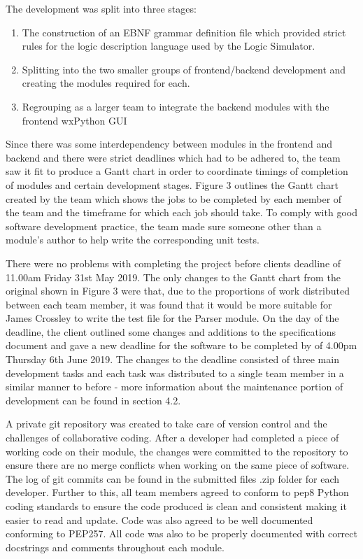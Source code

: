 \documentclass{article}					%
\begin{document}
The development was split into three stages:
\begin{enumerate}
  \item The construction of an EBNF grammar definition file which provided strict rules for the logic description language used by the Logic Simulator.
  \item Splitting into the two smaller groups of frontend/backend development and creating the modules required for each.
  \item Regrouping as a larger team to integrate the backend modules with the frontend wxPython GUI
\end{enumerate}

Since there was some interdependency between modules in the frontend and backend and there were strict deadlines which had to be adhered to, the team saw it fit to produce a Gantt chart in order to coordinate timings of completion of modules and certain development stages. Figure 3 outlines the Gantt chart created by the team which shows the jobs to be completed by each member of the team and the timeframe for which each job should take. To comply with good software development practice, the team made sure someone other than a module’s author to help write the corresponding unit tests.

There were no problems with completing the project before clients deadline of 11.00am Friday 31st May 2019. The only changes to the Gantt chart from the original shown in Figure 3 were that, due to the proportions of work distributed between each team member, it was found that it would be more suitable for James Crossley to write the test file for the Parser module. On the day of the deadline, the client outlined some changes and additions to the specifications document and gave a new deadline for the software to be completed by of 4.00pm Thursday 6th June 2019. The changes to the deadline consisted of three main development tasks and each task was distributed to a single team member in a similar manner to before - more information about the maintenance portion of development can be found in section 4.2.

A private git repository was created to take care of version control and the challenges of collaborative coding. After a developer had completed a piece of working code on their module, the changes were committed to the repository to ensure there are no merge conflicts when working on the same piece of software. The log of git commits can be found in the submitted files .zip folder for each developer. Further to this, all team members agreed to conform to pep8 Python coding standards to ensure the code produced is clean and consistent making it easier to read and update. Code was also agreed to be well documented conforming to PEP257. All code was also to be properly documented with correct docstrings and comments throughout each module.
\end{document}
